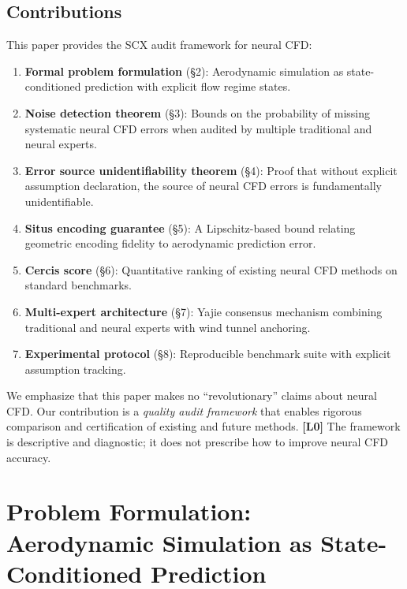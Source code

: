 \documentclass[11pt,a4paper]{article}
\theoremstyle{definition}
\theoremstyle{remark}
\newcommand{\limitationTag}[1]{\textsf{\textbf{[L#1]}}}
\begin{document}
\subsection{Contributions}

This paper provides the SCX audit framework for neural CFD:

\begin{enumerate}[label=(\roman*)]
    \item \textbf{Formal problem formulation} (§2): Aerodynamic simulation as state-conditioned prediction with explicit flow regime states.
    \item \textbf{Noise detection theorem} (§3): Bounds on the probability of missing systematic neural CFD errors when audited by multiple traditional and neural experts.
    \item \textbf{Error source unidentifiability theorem} (§4): Proof that without explicit assumption declaration, the source of neural CFD errors is fundamentally unidentifiable.
    \item \textbf{Situs encoding guarantee} (§5): A Lipschitz-based bound relating geometric encoding fidelity to aerodynamic prediction error.
    \item \textbf{Cercis score} (§6): Quantitative ranking of existing neural CFD methods on standard benchmarks.
    \item \textbf{Multi-expert architecture} (§7): Yajie consensus mechanism combining traditional and neural experts with wind tunnel anchoring.
    \item \textbf{Experimental protocol} (§8): Reproducible benchmark suite with explicit assumption tracking.
\end{enumerate}

\noindent We emphasize that this paper makes no ``revolutionary'' claims about neural CFD. Our contribution is a \emph{quality audit framework} that enables rigorous comparison and certification of existing and future methods. \limitationTag{0} The framework is descriptive and diagnostic; it does not prescribe how to improve neural CFD accuracy.

\section{Problem Formulation: Aerodynamic Simulation as State-Conditioned Prediction}
\end{document}
